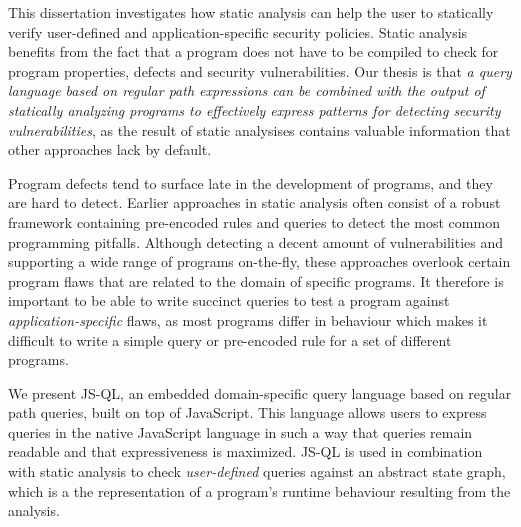 \setcounter{page}{1}





This dissertation investigates how static analysis can help the user to statically verify user-defined and application-specific security policies. Static analysis benefits from the fact that a program does not have to be compiled to check for program properties, defects and security vulnerabilities. Our thesis is that \textit{a query language based on regular path expressions can be combined with the output of statically analyzing programs to effectively express patterns for detecting security vulnerabilities}, as the result of static analysises contains valuable information that other approaches lack by default. 

Program defects tend to surface late in the development of programs, and they are hard to detect. Earlier approaches in static analysis often consist of a robust framework containing pre-encoded rules and queries to detect the most common programming pitfalls. Although detecting a decent amount of vulnerabilities and supporting a wide range of programs on-the-fly, these approaches overlook certain program flaws that are related to the domain of specific programs. It therefore is important to be able to write succinct queries to test a program against \textit{application-specific} flaws, as most programs differ in behaviour which makes it difficult to write a simple query or pre-encoded rule for a set of different programs. 

We present JS-QL, an embedded domain-specific query language based on regular path queries, built on top of JavaScript. This language allows users to express queries in the native JavaScript language in such a way that queries remain readable and that expressiveness is maximized. JS-QL is used in combination with static analysis to check \textit{user-defined} queries against an abstract state graph, which is a the representation of a program's runtime behaviour resulting from the analysis.


